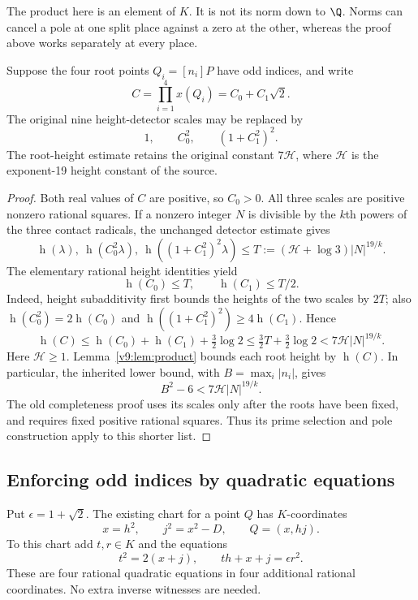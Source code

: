 The product here is an element of $K$. It is not its norm down to $\Q$. Norms can cancel a pole at one split place against a zero at the other, whereas the proof above works separately at every place.

\begin{corollary}\label{v9:cor:scales}
Suppose the four root points $Q_i=[n_i]P$ have odd indices, and write
\[
 C=\prod_{i=1}^4x(Q_i)=C_0+C_1\sqrt2.
\]
The original nine height-detector scales may be replaced by
\[
 1,\qquad C_0^2,\qquad (1+C_1^2)^2.
\]
The root-height estimate retains the original constant $7\mathcal H$, where $\mathcal H$ is the exponent-19 height constant of the source.
\end{corollary}
\begin{proof}
Both real values of $C$ are positive, so $C_0>0$. All three scales are positive nonzero rational squares. If a nonzero integer $N$ is divisible by the $k$th powers of the three contact radicals, the unchanged detector estimate gives
\[
 \operatorname{h}(\lambda),\ \operatorname{h}(C_0^2\lambda),\
 \operatorname{h}((1+C_1^2)^2\lambda)
 \le T:=(\mathcal H+\log3)|N|^{19/k}.
\]
The elementary rational height identities yield
\[
 \operatorname{h}(C_0)\le T,\qquad \operatorname{h}(C_1)\le T/2.
\]
Indeed, height subadditivity first bounds the heights of the two scales by $2T$; also $\operatorname{h}(C_0^2)=2\operatorname{h}(C_0)$ and $\operatorname{h}((1+C_1^2)^2)\ge4\operatorname{h}(C_1)$. Hence
\[
 \operatorname{h}(C)\le\operatorname{h}(C_0)+\operatorname{h}(C_1)+\tfrac32\log2
 \le\tfrac32T+\tfrac32\log2
 <7\mathcal H |N|^{19/k}.
\]
Here $\mathcal H\ge1$. Lemma~\ref{v9:lem:product} bounds each root height by $\operatorname{h}(C)$. In particular, the inherited lower bound, with $B=\max_i|n_i|$, gives
\begin{equation}\label{v9:eq:height-transfer}
 B^2-6<7\mathcal H |N|^{19/k}.
\end{equation}
The old completeness proof uses its scales only after the roots have been fixed, and requires fixed positive rational squares. Thus its prime selection and pole construction apply to this shorter list.
\end{proof}

\subsection{Enforcing odd indices by quadratic equations}\label{v9:sec:chart}
Put $\epsilon=1+\sqrt2$. The existing chart for a point $Q$ has $K$-coordinates
\[
 x=h^2,\qquad j^2=x^2-D,\qquad Q=(x,hj).
\]
To this chart add $t,r\in K$ and the equations
\begin{equation}\label{v9:eq:odd-chart}
 t^2=2(x+j),\qquad th+x+j=\epsilon r^2.
\end{equation}
These are four rational quadratic equations in four additional rational coordinates. No extra inverse witnesses are needed.

